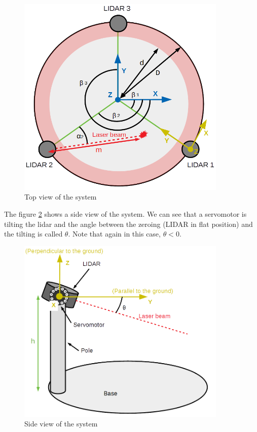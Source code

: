 \documentclass{article}
\begin{document}
\begin{figure}[H]
    \centering
    \includegraphics[width=10cm]{images/top_view_system.png}
    \caption{Top view of the system}
    \label{fig:top_view_system}
\end{figure}

The figure \ref{fig:side_view_system} shows a side view of the system. We can see that a servomotor is tilting the lidar and the angle between the zeroing (LIDAR in flat position) and the tilting is called $\theta$. Note that again in this case, $\theta < 0$.

\begin{figure}[H]
    \centering
    \includegraphics[width=10cm]{images/side_view_system.png}
    \caption{Side view of the system}
    \label{fig:side_view_system}
\end{figure}
\end{document}
